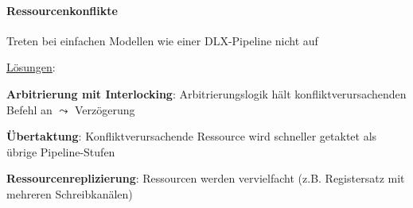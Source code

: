 \paragraph{Ressourcenkonflikte}
\begin{items}
  \item Treten bei einfachen Modellen wie einer DLX-Pipeline nicht auf
  \item \underline{Lösungen}:
  \begin{enumeration}
    \item \textbf{Arbitrierung mit Interlocking}: Arbitrierungslogik hält konfliktverursachenden Befehl an \( \leadsto \) Verzögerung
    \item \textbf{Übertaktung}: Konfliktverursachende Ressource wird schneller getaktet als übrige Pipeline-Stufen
    \item \textbf{Ressourcenreplizierung}: Ressourcen werden vervielfacht (z.B. Registersatz mit mehreren Schreibkanälen) 
  \end{enumeration}
\end{items}

\newpage

